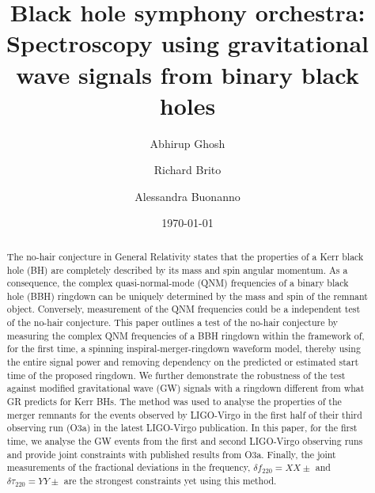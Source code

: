 \documentclass[twocolumn,prd,superscriptaddress,amsfonts,amssymb,amsmath,preprintnumbers]{revtex4-1}
\newcommand{\df}[1]{\delta f_{\text{#1}}}
\newcommand{\dtau}[1]{\delta \tau_{\text{#1}}}
\begin{document}
\title{Black hole symphony orchestra: Spectroscopy using gravitational wave signals from binary black holes}

\author{Abhirup Ghosh}
\author{Richard Brito}
\author{Alessandra Buonanno}

\date{\today}


\begin{abstract}
The no-hair conjecture in General Relativity states that the properties of a Kerr black hole (BH) are completely described by its mass and spin angular momentum. As a consequence, the complex quasi-normal-mode (QNM) frequencies of a binary black hole (BBH) ringdown can be uniquely determined by the mass and spin of the remnant object. Conversely, measurement of the QNM frequencies could be a independent test of the no-hair conjecture. This paper outlines a test of the no-hair conjecture by measuring the complex QNM frequencies of a BBH ringdown within the framework of, for the first time, a spinning inspiral-merger-ringdown waveform model, thereby using the entire signal power and removing dependency on the predicted or estimated start time of the proposed ringdown. We further demonstrate the robustness of the test against modified gravitational wave (GW) signals with a ringdown different from what GR predicts for Kerr BHs. The method was used to analyse the properties of the merger remnants for the events observed by LIGO-Virgo in the first half of their third observing run (O3a) in the latest LIGO-Virgo publication. In this paper, for the first time, we analyse the GW events from the first and second LIGO-Virgo observing runs and provide joint constraints with published results from O3a. Finally, the joint measurements of the fractional deviations in the frequency, $\df{220} = XX \pm$ and $\dtau{220} = YY \pm$ are the strongest constraints yet using this method. %
\end{abstract}

\maketitle
\end{document}
